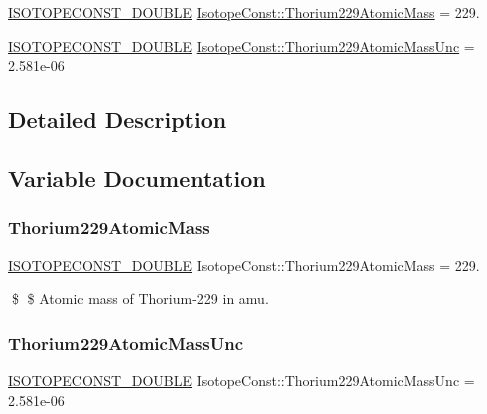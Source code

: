 \begin{DoxyCompactItemize}
\item 
\mbox{\hyperlink{group___isotope_const-_macros_ga8f45a7272ce02c0b4c65c44636ed719a}{I\+S\+O\+T\+O\+P\+E\+C\+O\+N\+S\+T\+\_\+\+D\+O\+U\+B\+LE}} \mbox{\hyperlink{group___isotope_const-_thorium-_th229_ga2ee0885671a27f94707b84d2e77b7c8b}{Isotope\+Const\+::\+Thorium229\+Atomic\+Mass}} = 229.
\item 
\mbox{\hyperlink{group___isotope_const-_macros_ga8f45a7272ce02c0b4c65c44636ed719a}{I\+S\+O\+T\+O\+P\+E\+C\+O\+N\+S\+T\+\_\+\+D\+O\+U\+B\+LE}} \mbox{\hyperlink{group___isotope_const-_thorium-_th229_gabec1f955c33b24a623e84d93fdf3dc7b}{Isotope\+Const\+::\+Thorium229\+Atomic\+Mass\+Unc}} = 2.\+581e-\/06
\end{DoxyCompactItemize}


\subsection{Detailed Description}


\subsection{Variable Documentation}
\mbox{\label{group___isotope_const-_thorium-_th229_ga2ee0885671a27f94707b84d2e77b7c8b}} 
\subsubsection{\texorpdfstring{Thorium229\+Atomic\+Mass}{Thorium229AtomicMass}}
{\footnotesize\ttfamily \mbox{\hyperlink{group___isotope_const-_macros_ga8f45a7272ce02c0b4c65c44636ed719a}{I\+S\+O\+T\+O\+P\+E\+C\+O\+N\+S\+T\+\_\+\+D\+O\+U\+B\+LE}} Isotope\+Const\+::\+Thorium229\+Atomic\+Mass = 229.}

\$ \$ Atomic mass of Thorium-\/229 in amu. \mbox{\label{group___isotope_const-_thorium-_th229_gabec1f955c33b24a623e84d93fdf3dc7b}} 
\subsubsection{\texorpdfstring{Thorium229\+Atomic\+Mass\+Unc}{Thorium229AtomicMassUnc}}
{\footnotesize\ttfamily \mbox{\hyperlink{group___isotope_const-_macros_ga8f45a7272ce02c0b4c65c44636ed719a}{I\+S\+O\+T\+O\+P\+E\+C\+O\+N\+S\+T\+\_\+\+D\+O\+U\+B\+LE}} Isotope\+Const\+::\+Thorium229\+Atomic\+Mass\+Unc = 2.\+581e-\/06}

